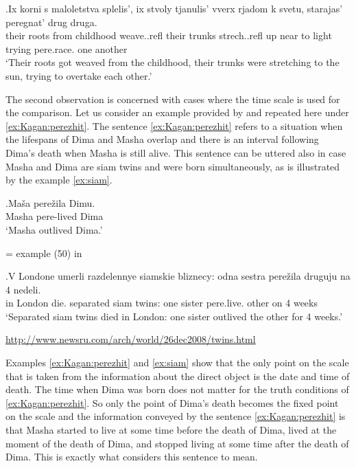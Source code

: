 \exg.\label{ex:peregnat}Ix korni s maloletstva splelis', ix stvoly tjanulis' vverx rjadom k svetu, starajas' peregnat' drug druga.\\
their roots from childhood weave..refl their trunks strech..refl up near to light trying pere.race. one another\\
\vspace{0.5em}
`Their roots got weaved from the childhood, their trunks were stretching to the sun, trying to overtake each other.'

The second observation is concerned with cases where the time scale is used for the comparison. Let us consider an example provided by \citet[142]{Kagan:book} and repeated here under \ref{ex:Kagan:perezhit}. The sentence \ref{ex:Kagan:perezhit} refers to a situation when the lifespans of Dima and Masha overlap and there is an interval following Dima's death when Masha is still alive. This sentence can be uttered also in case Masha and Dima are siam twins and were born simultaneously, as is illustrated by the example \ref{ex:siam}.

\exg.\label{ex:Kagan:perezhit}Ma\v{s}a pere\v{z}ila Dimu.\\
Masha pere-lived Dima\\
\vspace{0.5em}
`Masha outlived Dima.'
\begin{flushright}
\vspace{-0.5em}
= example (50) in \citet{Kagan:book}
\end{flushright}

\exg.\label{ex:siam}V Londone umerli razdelennye siamskie bliznecy: odna sestra pere\v{z}ila druguju na 4 nedeli.\\
in London die. separated siam twins: one sister pere.live. other on 4 weeks\\
\vspace{0.5em}
`Separated siam twins died in London: one sister outlived the other for 4 weeks.'
\begin{flushright}
\vspace{-0.5em}
\url{http://www.newsru.com/arch/world/26dec2008/twins.html}
\end{flushright}

Examples \ref{ex:Kagan:perezhit} and \ref{ex:siam} show that the only point on the scale that is taken from the information about the direct object is the date and time of death. The time when Dima was born does not matter for the truth conditions of \ref{ex:Kagan:perezhit}. So only the point of Dima's death becomes the fixed point on the scale and the information conveyed by the sentence \ref{ex:Kagan:perezhit} is that Masha started to live at some time before the death of Dima, lived at the moment of the death of Dima, and stopped living at some time after the death of Dima. This is exactly what \citet{Kagan:book} considers this sentence to mean. 

